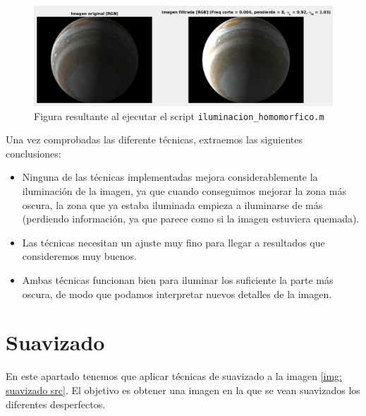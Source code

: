 \documentclass[12pt]{article}
\begin{document}
	\vspace{10px}

	\begin{figure}[h]
		\begin{center}
			\includegraphics[width=1\textwidth]{img/iluminacion_homomorfico.png}
			\caption{Figura resultante al ejecutar el script \texttt{iluminacion\_homomorfico.m}}
			\label{img: iluminacion homomorfico}
		\end{center}
	\end{figure}

	\pagebreak
	
	\noindent Una vez comprobadas las diferente técnicas, extraemos las siguientes conclusiones:
	\begin{itemize}
		\item Ninguna de las técnicas implementadas mejora considerablemente la iluminación de la imagen, ya que cuando conseguimos mejorar la zona más oscura, la zona que ya estaba iluminada empieza a iluminarse de más (perdiendo información, ya que parece como si la imagen estuviera quemada).
		\item Las técnicas necesitan un ajuste muy fino para llegar a resultados que consideremos muy buenos.
		\item Ambas técnicas funcionan bien para iluminar los suficiente la parte más oscura, de modo que podamos interpretar nuevos detalles de la imagen.
	\end{itemize}

	\pagebreak
	
	\section{Suavizado}
	
	\noindent En este apartado tenemos que aplicar técnicas de suavizado a la imagen \ref{img: suavizado src}. El objetivo es obtener una imagen en la que se vean suavizados los diferentes desperfectos.
	
\end{document}
